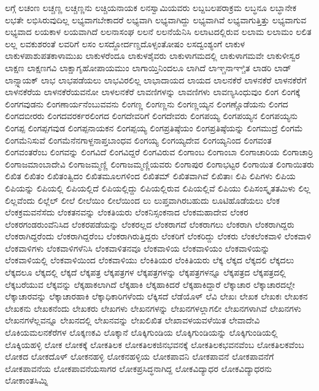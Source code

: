 {ಲಗ್ಗೆ
ಲಚಂಣ
ಲಚ್ಚಣ್ಣ
ಲಚ್ಚಣ್ಣನು
ಲಚ್ಚಿಯನಾಯಕ
ಲನಸ್ವಾಮಿಯವರು
ಲಬ್ದಬಲಪರಾಕ್ರಮ
ಲಬ್ಧನೂ
ಲಬ್ಧಾನೇಕ
ಲಭತೇ
ಲಭಿಸಿರುವುದಿಲ್ಲ
ಲಭ್ಯವಾಗಬೇಕಾದರೆ
ಲಭ್ಯವಾಗಿ
ಲಭ್ಯವಾಗಿದ್ದು
ಲಭ್ಯವಾಗಿವೆ
ಲಭ್ಯವಾಗುತ್ತಿತ್ತು
ಲಭ್ಯವಾಗುವ
ಲಭ್ಯವಾದ
ಲಯಕಾಳ
ಲಯವಾಗಿದೆ
ಲಲನಾಸಂಘ
ಲಲನೆ
ಲಲನೆಯೆನಿಸಿ
ಲಲಾಟದಲ್ಲಿರುವ
ಲಲಾಮ
ಲಲಾಮಂ
ಲಲಿತ
ಲಲ್ಲ
ಲವಕುಶರಂತೆ
ಲವರಿಗೆ
ಲಸಂ
ಲಸದ್ದೋರ್ದಣ್ಡದೊಳ್ಸಂತೋಷಂ
ಲಸದ್ವಂಶ್ಯಂಗೆ
ಲಾಕುಳ
ಲಾಕುಳಪಾಶುಪತಕಾಳಾಮುಖ
ಲಾಕುಳರೆಂದೂ
ಲಾಕುಳಶೈವರು
ಲಾಕುಳಾಗಮದಲ್ಲಿ
ಲಾಕುಳಾಗಮವೇ
ಲಾಕುಳೀಸ್ವರ
ಲಾಕ್ಷಣ
ಲಾಕ್ಷಣಗವಿ
ಲಾಕ್ಷಾಗೃಹೋಪಾಯಮುಂ
ಲಾಗಾಯ್ತಿನಿಂದಲೂ
ಲಾಗಿದೆ
ಲಾಞ್ಚನಾಞ್ಚಿತ
ಲಾಡರಿ
ಲಾಡ್
ಲಾನ್ಸ್ನಾಯಕ್
ಲಾಭ
ಲಾಭಪಡೆಯಲು
ಲಾಭವಿರಲಿಲ್ಲ
ಲಾಭಾದಾಯದ
ಲಾಯದ
ಲಾಲನಕೆರೆ
ಲಾಳನಕೆರೆ
ಲಾಳನಕೆರೆಗೆ
ಲಾಳನಕೆರೆಯ
ಲಾಳನಕೆರೆಯವನೋ
ಲಾಳಲನಕೆರೆ
ಲಾವಣಿಗಳನ್ನು
ಲಾವಣಿಗಳು
ಲಾವಣ್ಯಸಿಂಧುವುಂ
ಲಿಂಗ
ಲಿಂಗಕ್ಕೆ
ಲಿಂಗಗವುಡನು
ಲಿಂಗಣಾರ್ಯನೆಂಬುವವನು
ಲಿಂಗಣ್ಣ
ಲಿಂಗಣ್ಣನು
ಲಿಂಗಣ್ಣಯ್ಯನ
ಲಿಂಗಣ್ಣೊಡೆಯನು
ಲಿಂಗದ
ಲಿಂಗದಬೀರರು
ಲಿಂಗದವರರ್ಕರಲಿಂಗದ
ಲಿಂಗದೇವರಿಗೆ
ಲಿಂಗದೇವರು
ಲಿಂಗಪಯ್ಯ
ಲಿಂಗಪಯ್ಯನ
ಲಿಂಗಪಯ್ಯನು
ಲಿಂಗಪ್ಪ
ಲಿಂಗಪ್ಪಗವುಡ
ಲಿಂಗಪ್ಪನಾಯಕನ
ಲಿಂಗಪ್ಪಯ್ಯ
ಲಿಂಗಪ್ರತಿಷ್ಠೆಯಂ
ಲಿಂಗಪ್ರತಿಷ್ಠೆಯನ್ನು
ಲಿಂಗಮುದ್ರೆ
ಲಿಂಗಮೆ
ಲಿಂಗಮೆನಿಸುವೆ
ಲಿಂಗಮೆನೆನಗಾಳ್ದನಾಪ್ತಬಾಂಧವ
ಲಿಂಗಯ್ಯ
ಲಿಂಗಯ್ಯದೇವ
ಲಿಂಗಯ್ಯನಿಂದ
ಲಿಂಗವಂತ
ಲಿಂಗವಂತರೆಂಬ
ಲಿಂಗವನ್ನು
ಲಿಂಗವಿದೆ
ಲಿಂಗವಿದ್ದರೆ
ಲಿಂಗವಿರುವ
ಲಿಂಗಾಂಬ
ಲಿಂಗಾಂಬಾ
ಲಿಂಗಾಚಾರಿಯ
ಲಿಂಗಾಚಾರ್ರಿ
ಲಿಂಗಾಜಮಾಂಬಾದೇವಿ
ಲಿಂಗಾಜಮ್ಮಣ್ಣಿ
ಲಿಂಗಾಜಮ್ಮಣ್ಣಿಯವರು
ಲಿಂಗಾಪುರ
ಲಿಂಗಾಭಟ್ಟರ
ಲಿಂಗಾಯಿತ
ಲಿಂಗಾಯಿತರು
ಲಿಖಿತ
ಲಿಖಿತಂ
ಲಿಖಿತಂತ್ವಿದಂ
ಲಿಖಿತಮೂಲಗಳಿಂದ
ಲಿಖಿತಮ್
ಲಿಖಿತವಾಗಿವೆ
ಲಿಖಿತಾಃ
ಲಿಪಿ
ಲಿಪಿಗಳು
ಲಿಪಿಯ
ಲಿಪಿಯನ್ನು
ಲಿಪಿಯಲ್ಲಿ
ಲಿಪಿಯಲ್ಲಿದೆ
ಲಿಪಿಯಲ್ಲಿದ್ದು
ಲಿಪಿಯಲ್ಲಿರುವ
ಲಿಪಿಯಲ್ಲಿವೆ
ಲಿಪಿಯು
ಲಿಪಿಸಂಸ್ಕೃತತಮಿಳು
ಲಿಲ್ಲ
ಲಿಲ್ಲವೆಂದು
ಲಿಲ್ಲೆಲ್
ಲೀಲೆ
ಲೀಲೆಯಿಂ
ಲೀಲೆಯಿಂದ
ಲು
ಲುಪ್ತವಾಗಿರಬಹುದು
ಲೂಟಿಹೊಡೆಯಲು
ಲೆಂಕ
ಲೆಂಕಕ್ರಮವನೆಸೆದು
ಲೆಂಕತನವನ್ನು
ಲೆಂಕತಿಯರು
ಲೆಂಕನಿಸ್ಸಂಕನಾದ
ಲೆಂಕಮಹಾದೇವ
ಲೆಂಕರ
ಲೆಂಕರಗಂಡರುಂವೆನಿಸಿದ
ಲೆಂಕರಪಡೆಯನ್ನು
ಲೆಂಕರಲ್ಲದ
ಲೆಂಕರಾಗದೆ
ಲೆಂಕರಾಗಲು
ಲೆಂಕರಾಗಿ
ಲೆಂಕರಾಗಿದ್ದರು
ಲೆಂಕರಾಗಿದ್ದರೆಂದು
ಲೆಂಕರಾಗಿದ್ದರೆಂಬ
ಲೆಂಕರಾಗಿರುತ್ತಿದ್ದರು
ಲೆಂಕರಿಗೆ
ಲೆಂಕರಿದ್ದು
ಲೆಂಕರು
ಲೆಂಕಲೆಂಕವಾಳಿ
ಲೆಂಕವಾಳಿ
ಲೆಂಕವಾಳಿಗಳು
ಲೆಂಕವಾಳಿಗಳೆನಿಸಿ
ಲೆಂಕವಾಳಿತನವೂ
ಲೆಂಕವಾಳಿಯ
ಲೆಂಕವಾಳಿಯಂ
ಲೆಂಕವಾಳಿಯನ್ನು
ಲೆಂಕವಾಳಿಯಲ್ಲಿ
ಲೆಂಕವಾಳಿಯಿಂದ
ಲೆಂಕವಾಳಿಯು
ಲೆಂಕಿತಿಯರ
ಲೆಂಕಿತಿಯರು
ಲೆಕ್ಕ
ಲೆಕ್ಕದ
ಲೆಕ್ಕದಲಿ
ಲೆಕ್ಕದಲು
ಲೆಕ್ಕದಲೂ
ಲೆಕ್ಕದಲ್ಲಿ
ಲೆಕ್ಕದೆ
ಲೆಕ್ಕಪತ್ರ
ಲೆಕ್ಕಪತ್ರಗಳ
ಲೆಕ್ಕಪತ್ರಗಳನ್ನು
ಲೆಕ್ಕಪತ್ರಗಳನ್ನೂ
ಲೆಕ್ಕಪತ್ರದ
ಲೆಕ್ಕಪತ್ರದಲ್ಲಿ
ಲೆಕ್ಕಬರೆಯುವ
ಲೆಕ್ಕವನ್ನು
ಲೆಕ್ಕಹಾಕಲಾಗಿದೆ
ಲೆಕ್ಕಹಾಕಿ
ಲೆಕ್ಕಹಾಕಿದರೆ
ಲೆಕ್ಕಹಾಕಿದ್ದಾರೆ
ಲೆಕ್ಕಾಚಾರ
ಲೆಕ್ಕಾಚಾರದಲ್ಲೇ
ಲೆಕ್ಕಾಚಾರವನ್ನು
ಲೆಕ್ಕಾಚಾರಹಾಕಿ
ಲೆಕ್ಕಾಧಿಕಾರಿಗಳೆಂದು
ಲೆಕ್ಕಿಸದೆ
ಲೆಡೆಯೊಳ್
ಲೆವಿ
ಲೇಖಃ
ಲೇಖಕ
ಲೇಖಕಃ
ಲೇಖಕನ
ಲೇಖಕನು
ಲೇಖಕನೆಂದು
ಲೇಖಕರು
ಲೇಖಗಳು
ಲೇಖನಗಳನ್ನು
ಲೇಖನಗಳಲ್ಲಾಗಲೀ
ಲೇಖನಗಳಾಗಿವೆ
ಲೇಖನಗಳು
ಲೇಖನಗಳೆಲ್ಲವನ್ನೂ
ಲೇಖನದಲ್ಲಿ
ಲೇಖನವನ್ನು
ಲೇಖಲಿಖಿತ
ಲೇಖಾವಳಯವಳೆಯಿತ
ಲೇವಾದೇವಿ
ಲೊಕಿಯಮಲನಕೆರೆಗಳ
ಲೊಕ್ಕಣಕವಿ
ಲೊಕ್ಕಾನೆ
ಲೊಕ್ಕಿಗುಂಡಿಯ
ಲೊಕ್ಕಿಗುಂಡಿಯನ್ನು
ಲೊಕ್ಕಿಗುಂಡಿಯಲ್ಲಿ
ಲೊಕ್ಕಿಯಹಳ್ಳಿ
ಲೋಕ
ಲೋಕಕ್ಕೆ
ಲೋಕತಿಲಕ
ಲೋಕತಿಲಕಜಿನಭವನಕ್ಕೆ
ಲೋಕತಿಲಕಭವನವೆಂಬ
ಲೋಕತಿಲಕವೆಂಬ
ಲೋಕದ
ಲೋಕದೊಳ್
ಲೋಕನಹಳ್ಳಿ
ಲೋಕನಹಳ್ಳಿಯ
ಲೋಕಪಾವನಿ
ಲೋಕಪಾವನೆ
ಲೋಕಪಾವನೆಗೆ
ಲೋಕಪಾವನೆಯ
ಲೋಕಪಾವನೆಯಸಾಗರ
ಲೋಕಪ್ರಸಿದ್ಧನಾಗಿದ್ದ
ಲೋಕವಿದ್ಯಾಧರ
ಲೋಕವಿದ್ಯಾಧರನು
ಲೋಕಾಂತಸಿಮ್ನಿ
}
